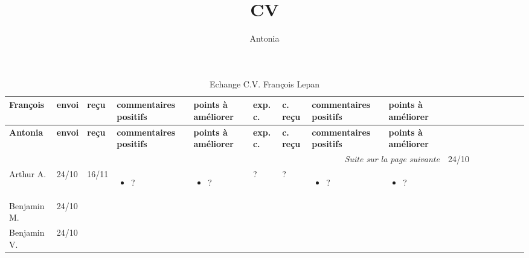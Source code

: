 \documentclass[a4paper,11pt]{article}
\title{CV}
\author{Antonia}
\begin{document}
\begin{landscape}
  \footnotesize   
  \begin{longtable}{|l|l|l|p{4cm}|p{4cm}|l|l|p{4cm}|p{4cm}|}
    \caption{Echange C.V. François Lepan}\\
    \hline \bfseries François&\bfseries envoi&\bfseries reçu&\bfseries
    commentaires positifs&\bfseries points à améliorer&\bfseries
    exp. c.&\bfseries c. reçu&\bfseries commentaires positifs&\bfseries points à
    améliorer\\ \hline \hline
    \endfirsthead
    \hline \bfseries Antonia&\bfseries envoi&\bfseries reçu&\bfseries
    commentaires positifs&\bfseries points à améliorer&\bfseries
    exp. c.&\bfseries c. reçu&\bfseries commentaires positifs&\bfseries points à
    améliorer\\ \hline \hline
    \endhead 
    \hline \multicolumn{9}{r}{\emph{Suite sur la page suivante}}
    \endfoot
    \hline
    \endlastfoot
    \hline

             
    Amara T.  & 24/10 & %
	      & &
	      & & 
	      & & \\ \hline

    Arthur A. & 24/10 & 16/11 %
	      & \begin{itemize}
		\item ?
		\end{itemize}
	      & \begin{itemize}
		\item ?
		\end{itemize}
	      & ? & ?
	      & \begin{itemize}
		\item ?
		\end{itemize}
	      & \begin{itemize}
		\item ?
		\end{itemize} \\ \hline

    Benjamin M. & 24/10 & & & & & & & \\ \hline
    Benjamin V. & 24/10 & & & & & & & \\ \hline


\end{longtable}
\end{landscape}
\end{document}
